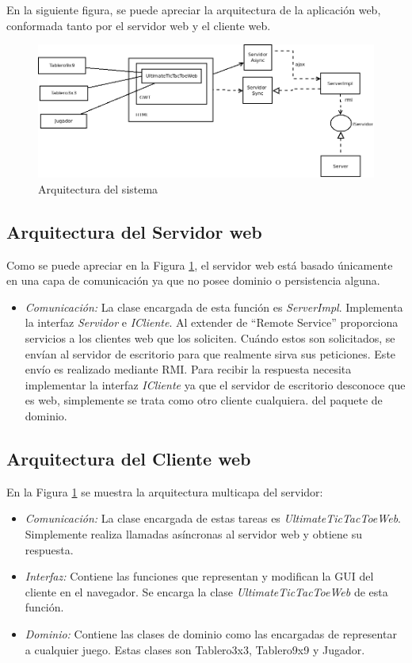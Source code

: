 En la siguiente figura, se puede apreciar la arquitectura de la aplicación web, conformada tanto por el servidor web y el cliente web.

 \begin{figure}[h]
 \centering
 \includegraphics[scale=0.55]{img/diagrama.png}
 \caption{Arquitectura del sistema}
 \label{arq_sistema}
 \end{figure}

\subsection{Arquitectura del Servidor web}

Como se puede apreciar en la Figura \ref{arq_sistema}, el servidor web está basado únicamente en una capa de comunicación ya que no posee dominio o persistencia alguna.

\begin{itemize}
  \item \emph{Comunicación:} La clase encargada de esta función es \emph{ServerImpl}. Implementa la interfaz \emph{Servidor} e \emph{ICliente}. Al extender de ``Remote Service'' proporciona servicios a los clientes web que los soliciten. Cuándo estos son solicitados, se envían al servidor de escritorio para que realmente sirva sus peticiones. Este envío es realizado mediante RMI. Para recibir la respuesta necesita implementar la interfaz \emph{ICliente} ya que el servidor de escritorio desconoce que es web, simplemente se trata como otro cliente cualquiera.
 del paquete de dominio.
\end{itemize}

\subsection{Arquitectura del Cliente web}

En la Figura \ref{arq_sistema} se muestra la arquitectura multicapa del servidor:

\begin{itemize}
 \item \emph{Comunicación:} La clase encargada de estas tareas es \emph{UltimateTicTacToeWeb}. Simplemente realiza llamadas asíncronas al servidor web y obtiene su respuesta.
  \item \emph{Interfaz:} Contiene las funciones que representan y modifican la GUI del cliente en el navegador. Se encarga la clase \emph{UltimateTicTacToeWeb} de esta función.
 \item \emph{Dominio:} Contiene las clases de dominio como las encargadas de representar a cualquier juego. Estas clases son Tablero3x3, Tablero9x9 y Jugador.
\end{itemize}
